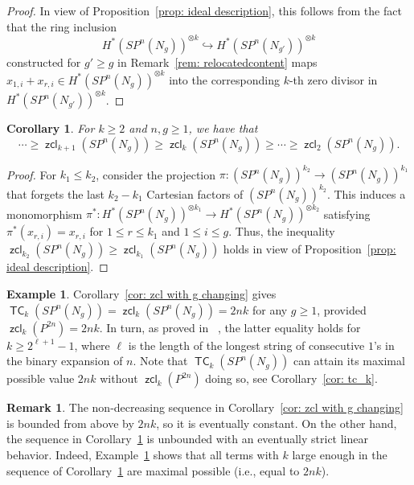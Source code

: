 \documentclass[amscd,amssymb,verbatim,10pt]{amsart}
\numberwithin{equation}{section}
\theoremstyle{plain}
\newtheorem{corollary}[thm]{Corollary}
\theoremstyle{definition}
\newtheorem{remark}[thm]{Remark}
\newtheorem{ex}[thm]{Example}
\DeclareMathOperator{\TC}{{\mathsf{TC}}}
\DeclareMathOperator{\zcl}{{\mathsf{zcl}}}
\begin{document}
\begin{proof}
In view of Proposition~\ref{prop: ideal description}, this follows from the fact that the ring inclusion $$H^*(SP^n(N_{g}))^{\otimes k}\hookrightarrow H^*(SP^n(N_{g'}))^{\otimes k}$$ constructed for $g'\geq g$ in Remark~\ref{rem: relocatedcontent} maps $x_{1,i}+x_{r,i}\in H^*(SP^n(N_{g}))^{\otimes k}$ into the corresponding $k$-th zero divisor in $H^*(SP^n(N_{g'}))^{\otimes k}$.
\end{proof}

\begin{corollary}\label{cor: zcl with k changing}
For $k\ge 2$ and $n,g \ge 1$, we have that
\[
\cdots\ge \zcl_{k+1}(SP^n(N_{g}))\ge \zcl_k(SP^n(N_{g})) \ge \cdots\ge\zcl_2(SP^{n}(N_g)).
\]
\end{corollary}

\begin{proof}
For $k_1\le k_2$, consider the projection $\pi\colon (SP^n(N_g))^{k_2} \to (SP^n(N_g))^{k_1}$ that forgets the last $k_2-k_1$ Cartesian factors of $(SP^n(N_g))^{k_2}$. This induces a monomorphism $\pi^*\colon H^*(SP^n(N_g))^{\otimes k_1}\to H^*(SP^n(N_g))^{\otimes k_2}$ satisfying $\pi^*(x_{r,i})=x_{r,i}$ for $1\le r\le k_1$ and $1\le i \le g$. Thus, the inequality $\zcl_{k_2}(SP^n(N_{g}))\ge \zcl_{k_1}(SP^n(N_{g}))$ holds in view of Proposition~\ref{prop: ideal description}.
\end{proof}

\begin{ex}\label{maximalidaddeTC}
Corollary~\ref{cor: zcl with g changing} gives $\TC_k(SP^n(N_g))=\zcl_k(SP^n(N_g))=2nk$ for any $g\ge 1$, provided $\zcl_k(P^{2n})=2nk$. In turn, as proved in ~\cite[Proposition~1.4]{Dav}, the latter equality holds for $k\ge 2^{\ell+1}-1$, where $\ell$ is the length of the longest string of consecutive $1$'s in the binary expansion of $n$. Note that $\TC_k(SP^n(N_g))$ can attain its maximal possible value $2nk$ without $\zcl_k(P^{2n})$ doing so, see Corollary~\ref{cor: tc_k}.
\end{ex}

\begin{remark}\label{rem: on different zcls}
The non-decreasing sequence in Corollary~\ref{cor: zcl with g changing} is bounded from above by $2nk$, so it is eventually constant. On the other hand, the sequence in Corollary~\ref{cor: zcl with k changing} is unbounded with an eventually strict linear behavior. Indeed, Example~\ref{maximalidaddeTC} shows that all terms with $k$ large enough in the sequence of Corollary~\ref{cor: zcl with k changing} are maximal possible (i.e., equal to $2nk$).
\end{remark}
\end{document}
